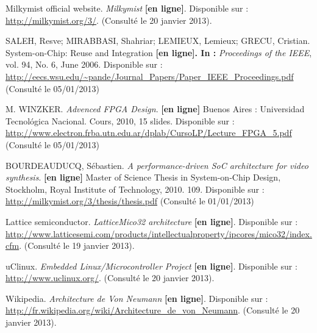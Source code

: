 \documentclass{report}
\begin{document}
\begin{thebibliography}{1}
Milkymist official website. \textit{Milkymist} \textbf{[en ligne]}. Disponible sur : \url{http://milkymist.org/3/}. (Consulté le 20 janvier 2013).


SALEH, Resve; MIRABBASI, Shahriar; LEMIEUX, Lemieux; GRECU, Cristian. System-on-Chip: Reuse and Integration \textbf{[en ligne]. In :} \textit{Proceedings of the IEEE}, vol. 94, No. 6, June 2006. Disponible sur : \url{http://eecs.wsu.edu/~pande/Journal\_Papers/Paper\_IEEE\_Proceedings.pdf} (Consulté le 05/01/2013)

M. WINZKER. \textit{Advenced FPGA Design}. \textbf{[en ligne]} Buenos Aires : Universidad Tecnológica Nacional. Cours, 2010, 15 slides. Disponible sur : \url{http://www.electron.frba.utn.edu.ar/dplab/CursoLP/Lecture\_FPGA\_5.pdf} (Consulté le 05/01/2013)

BOURDEAUDUCQ, Sébastien. \textit{A performance-driven SoC architecture for video synthesis}. \textbf{[en ligne]} Master of Science Thesis in System-on-Chip Design, Stockholm, Royal Institute of Technology, 2010. 109. Disponible sur : \url{http://milkymist.org/3/thesis/thesis.pdf} (Consulté le 01/01/2013)

Lattice semiconductor. \textit{LatticeMico32 architecture} \textbf{[en ligne]}. Disponible sur : \url{http://www.latticesemi.com/products/intellectualproperty/ipcores/mico32/index.cfm}. (Consulté le 19 janvier 2013).

uClinux. \textit{Embedded Linux/Microcontroller Project} \textbf{[en ligne]}. Disponible sur : \url{http://www.uclinux.org/}. (Consulté le 20 janvier 2013).

Wikipedia. \textit{Architecture de Von Neumann} \textbf{[en ligne]}. Disponible sur : \url{http://fr.wikipedia.org/wiki/Architecture_de_von_Neumann}. (Consulté le 20 janvier 2013).
\end{thebibliography}
\end{document}
